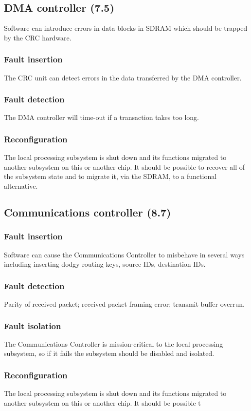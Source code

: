 \documentclass[11pt]{article}
\begin{document}
\subsection{DMA controller (7.5)}
Software can introduce errors in data blocks in SDRAM which should be trapped by the CRC
hardware.
\subsubsection*{Fault insertion}
The CRC unit can detect errors in the data transferred by the DMA controller.
\subsubsection*{Fault detection}
The DMA controller will time-out if a transaction takes too long.
\subsubsection*{Reconfiguration}
The local processing subsystem is shut down and its functions migrated to another subsystem on
this or another chip. It should be possible to recover all of the subsystem state and to migrate it, via
the SDRAM, to a functional alternative.

\subsection{Communications controller (8.7)}
\subsubsection*{Fault insertion}
Software can cause the Communications Controller to misbehave in several ways including
inserting dodgy routing keys, source IDs, destination IDs.
\subsubsection*{Fault detection}
Parity of received packet; received packet framing error; transmit buffer overrun.
\subsubsection*{Fault isolation}
The Communications Controller is mission-critical to the local processing subsystem, so if it fails
the subsystem should be disabled and isolated.
\subsubsection*{Reconfiguration}
The local processing subsystem is shut down and its functions migrated to another subsystem on
this or another chip. It should be possible t
\end{document}
